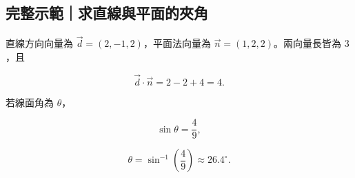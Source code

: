 \documentclass[11pt,a4paper]{article}
\begin{document}
\begin{HandoutWorkedExample}

\subsection{完整示範｜求直線與平面的夾角}\label{ux5b8cux6574ux793aux7bc4ux6c42ux76f4ux7ddaux8207ux5e73ux9762ux7684ux593eux89d2}

直線方向向量為 \(\vec d=(2,-1,2)\)，平面法向量為 \(\vec n=(1,2,2)\)。兩向量長皆為 \(3\)，且

\[
\vec d\cdot\vec n=2-2+4=4.
\]

若線面角為 \(\theta\)，

\[
\sin\theta=\frac49,
\]

\[
\boxed{\theta=\sin^{-1}\!\left(\frac49\right)\approx26.4^\circ}.
\]

\end{HandoutWorkedExample}
\end{document}
